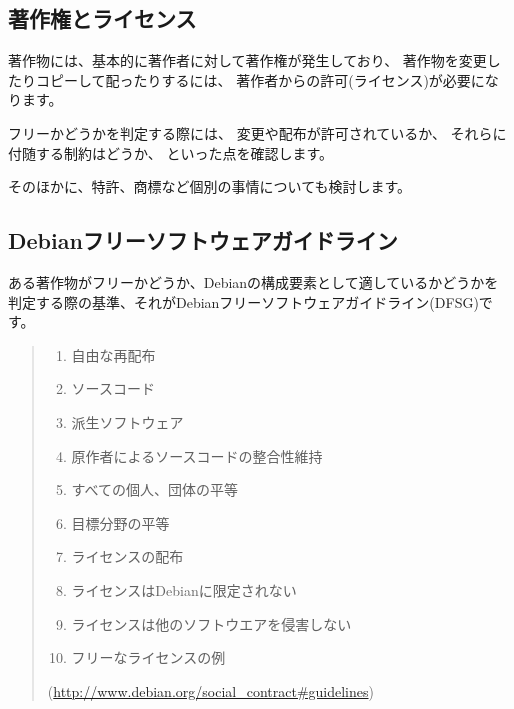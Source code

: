 \documentclass[mingoth,a4paper]{jsarticle}
\begin{document}
\subsection{著作権とライセンス}

著作物には、基本的に著作者に対して著作権が発生しており、
著作物を変更したりコピーして配ったりするには、
著作者からの許可(ライセンス)が必要になります。

フリーかどうかを判定する際には、
変更や配布が許可されているか、
それらに付随する制約はどうか、
といった点を確認します。

そのほかに、特許、商標など個別の事情についても検討します。

\subsection{Debianフリーソフトウェアガイドライン}

ある著作物がフリーかどうか、Debianの構成要素として適しているかどうかを
判定する際の基準、それがDebianフリーソフトウェアガイドライン(DFSG)です。

\begin{quote}
\begin{enumerate}
 \item 自由な再配布

 \item ソースコード

 \item 派生ソフトウェア

 \item 原作者によるソースコードの整合性維持

 \item すべての個人、団体の平等

 \item 目標分野の平等

 \item ライセンスの配布

 \item ライセンスはDebianに限定されない

 \item ライセンスは他のソフトウエアを侵害しない

 \item フリーなライセンスの例

\end{enumerate}

(\url{http://www.debian.org/social_contract#guidelines})
\end{quote}
\end{document}
